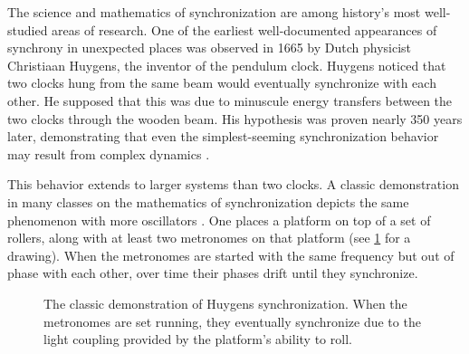 The science and mathematics of synchronization are among history's most well-studied areas of research.
One of the earliest well-documented appearances of synchrony in unexpected places was observed in 1665 by Dutch physicist Christiaan Huygens, the inventor of the pendulum clock.
Huygens noticed that two clocks hung from the same beam would eventually synchronize with each other.
He supposed that this was due to minuscule energy transfers between the two clocks through the wooden beam.
His hypothesis was proven nearly 350 years later, demonstrating that even the simplest-seeming synchronization behavior may result from complex dynamics \cite{PenaRamirez2016}.

This behavior extends to larger systems than two clocks.
A classic demonstration in many classes on the mathematics of synchronization depicts the same phenomenon with more oscillators \cite{Pantaleone2002}.
One places a platform on top of a set of rollers, along with at least two metronomes on that platform (see \cref{fig:metronome_demo} for a drawing).
When the metronomes are started with the same frequency but out of phase with each other, over time their phases drift until they synchronize.
\begin{figure}[ht]
  \centering
  \caption[Synchronization demonstration]{The classic demonstration of Huygens synchronization.  When the metronomes are set running, they eventually synchronize due to the light coupling provided by the platform's ability to roll.}
  \label{fig:metronome_demo}
\end{figure}

